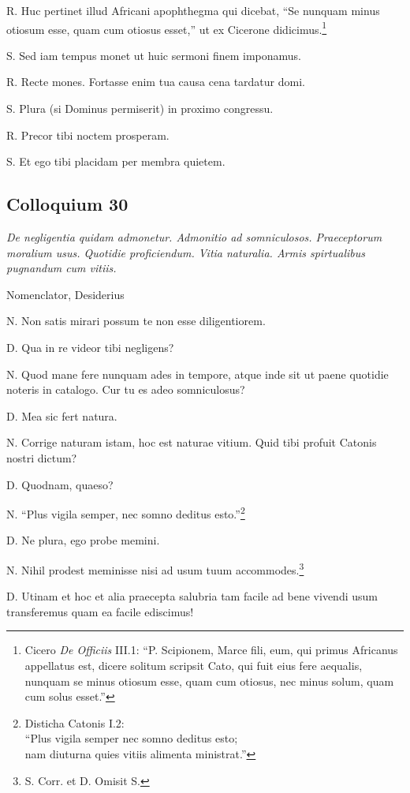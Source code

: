 \documentclass{article}
\begin{document}
R. Huc pertinet illud Africani apophthegma qui dicebat, ``Se nunquam minus otiosum esse, quam cum otiosus esset,'' ut ex Cicerone didicimus.\footnote{Cicero \emph{De Officiis} III.1: ``P. Scipionem, Marce fili, eum, qui primus Africanus appellatus est, dicere solitum scripsit Cato, qui fuit eius fere aequalis, nunquam se minus otiosum esse, quam cum otiosus, nec minus solum, quam cum solus esset.''}

S. Sed iam tempus monet ut huic sermoni finem imponamus.

R. Recte mones. Fortasse enim tua causa cena tardatur domi.

S. Plura (si Dominus permiserit) in proximo congressu.

R. Precor tibi noctem prosperam.

S. Et ego tibi placidam per membra quietem.

\subsection{Colloquium 30}
\emph{De negligentia quidam admonetur. Admonitio ad somniculosos. Praeceptorum moralium usus. Quotidie proficiendum. Vitia naturalia. Armis spirtualibus pugnandum cum vitiis.}

Nomenclator, Desiderius

N. Non satis mirari possum te non esse diligentiorem.

D. Qua in re videor tibi negligens?

N. Quod mane fere nunquam ades in tempore, atque inde sit ut paene quotidie noteris in catalogo. Cur tu es adeo somniculosus?

D. Mea sic fert natura.

N. Corrige naturam istam, hoc est naturae vitium. Quid tibi profuit Catonis nostri dictum?

D. Quodnam, quaeso?

N. ``Plus vigila semper, nec somno deditus esto.''\footnote{Disticha Catonis I.2:\\``Plus vigila semper nec somno deditus esto;\\nam diuturna quies vitiis alimenta ministrat.''}

D. Ne plura, ego probe memini.

N. Nihil prodest meminisse nisi ad usum tuum accommodes.\footnote{S. Corr. et  D. Omisit S.}

D. Utinam et hoc et alia praecepta salubria tam facile ad bene vivendi usum transferemus quam ea facile ediscimus!
\end{document}

